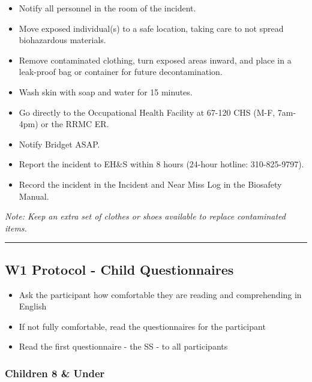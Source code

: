 \documentclass[
]{book}
\providecommand{\tightlist}{%
  \setlength{\itemsep}{0pt}\setlength{\parskip}{0pt}}
\begin{document}
\begin{itemize}
\tightlist
\item
  Notify all personnel in the room of the incident.
\item
  Move exposed individual(s) to a safe location, taking care to not spread biohazardous materials.
\item
  Remove contaminated clothing, turn exposed areas inward, and place in a leak-proof bag or container for future decontamination.
\item
  Wash skin with soap and water for 15 minutes.
\item
  Go directly to the Occupational Health Facility at 67-120 CHS (M-F, 7am-4pm) or the RRMC ER.
\item
  Notify Bridget ASAP.
\item
  Report the incident to EH\&S within 8 hours (24-hour hotline: 310-825-9797).
\item
  Record the incident in the Incident and Near Miss Log in the Biosafety Manual.
\end{itemize}

\emph{Note: Keep an extra set of clothes or shoes available to replace contaminated items.}

\begin{center}\rule{0.5\linewidth}{0.5pt}\end{center}

\hypertarget{w1-protocol---child-questionnaires}{%
\subsection{W1 Protocol - Child Questionnaires}\label{w1-protocol---child-questionnaires}}

\begin{itemize}
\tightlist
\item
  Ask the participant how comfortable they are reading and comprehending in English
\item
  If not fully comfortable, read the questionnaires for the participant
\item
  Read the first questionnaire - the SS - to all participants
\end{itemize}

\hypertarget{children-8-under}{%
\subsubsection{Children 8 \& Under}\label{children-8-under}}
\end{document}
